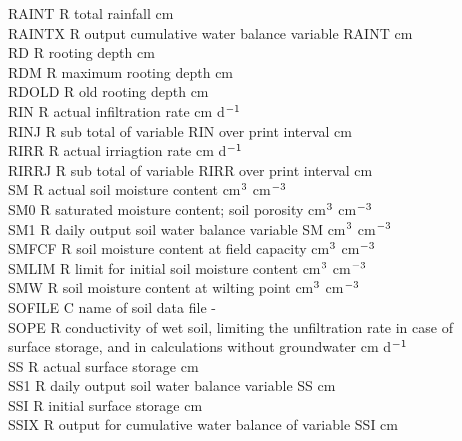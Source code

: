\documentclass[11pt]{article}
\begin{document}
\begin{tabbing}
RAINT\> \> R\> total rainfall\> \> \> \> \> \> \> cm\\
RAINTX\> \> R\> output cumulative water balance variable RAINT\> \> \> \> \> \> \> cm\\
RD\> \> R\> rooting depth\> \> \> \> \> \> \> cm\\
RDM\> \> R\> maximum rooting depth\> \> \> \> \> \> \> cm\\
RDOLD\> \> R\> old rooting depth\> \> \> \> \> \> \> cm\\
RIN\> \> R\> actual infiltration rate\> \> \> \> \> \> \> cm d$^{{\rm -1}}$\\
RINJ\> \> R\> sub total of variable RIN over print interval\> \> \> \> \> \> \> cm\\
RIRR\> \> R\> actual irriagtion rate\> \> \> \> \> \> \> cm d$^{{\rm -1}}$\\
RIRRJ\> \> R\> sub total of variable RIRR over print interval\> \> \> \> \> \> \> cm\\
SM\> \> R\> actual soil moisture content\> \> \> \> \> \> \> cm$^{{\rm 3}}$ cm$^{{\rm -3}}$\\
SM0\> \> R\> saturated moisture content; soil porosity\> \> \> \> \> \> \> cm$^{{\rm 3}}$ cm$^{{\rm -3}}$\\
SM1\> \> R\> daily output soil water balance variable SM\> \> \> \> \> \> \> cm$^{{\rm 3}}$ cm$^{{\rm -3}}$\\
SMFCF\> \> R\> soil moisture content at field capacity\> \> \> \> \> \> \> cm$^{{\rm 3}}$ cm$^{{\rm -3}}$\\
SMLIM\> \> R\> limit for initial soil moisture content\> \> \> \> \> \> \> cm$^{{\rm 3}}$ cm$^{{\rm -3}}$\\
SMW\> \> R\> soil moisture content at wilting point\> \> \> \> \> \> \> cm$^{{\rm 3}}$ cm$^{{\rm -3}}$\\
SOFILE\> \> C\> name of soil data file\> \> \> \> \> \> \> -\\
SOPE\> \> R\> conductivity of wet soil, limiting the unfiltration rate in case of \\
\>\> \> surface storage, and in calculations without groundwater \> \> \> \> \> \> \> cm d$^{{\rm -1}}$\\
SS\> \> R\> actual surface storage\> \> \> \> \> \> \> cm\\
SS1\> \> R\> daily output soil water balance variable SS\> \> \> \> \> \> \> cm\\
SSI\> \> R\> initial surface storage\> \> \> \> \> \> \> cm\\
SSIX\> \> R\> output for cumulative water balance of variable SSI\> \> \> \> \> \> \> cm\\

\end{tabbing}
\end{document}
